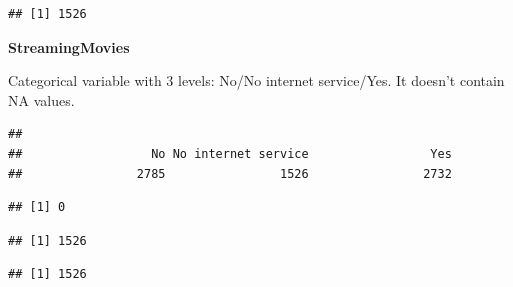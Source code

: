 \documentclass[
  twoside]{article}
\newenvironment{Shaded}{\begin{snugshade}}{\end{snugshade}}
\newcommand{\CommentTok}[1]{\textcolor[rgb]{0.56,0.35,0.01}{\textit{#1}}}
\newcommand{\FunctionTok}[1]{\textcolor[rgb]{0.00,0.00,0.00}{#1}}
\newcommand{\NormalTok}[1]{#1}
\newcommand{\SpecialCharTok}[1]{\textcolor[rgb]{0.00,0.00,0.00}{#1}}
\newcommand{\StringTok}[1]{\textcolor[rgb]{0.31,0.60,0.02}{#1}}
\begin{document}
\begin{verbatim}
## [1] 1526
\end{verbatim}

\textbf{StreamingMovies}

Categorical variable with 3 levels: No/No internet service/Yes. It
doesn't contain NA values.

\begin{verbatim}
## 
##                  No No internet service                 Yes 
##                2785                1526                2732
\end{verbatim}

\begin{verbatim}
## [1] 0
\end{verbatim}

\begin{Shaded}
\end{Shaded}

\begin{verbatim}
## [1] 1526
\end{verbatim}

\begin{Shaded}
\end{Shaded}

\begin{verbatim}
## [1] 1526
\end{verbatim}
\end{document}
